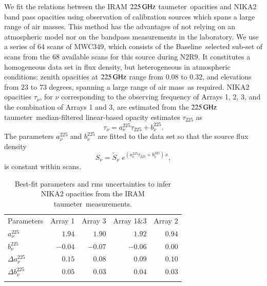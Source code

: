 \documentclass[traditionalabstract]{aa}
\newcommand{\baseline}{Baseline}%
\newcommand{\taunu}{\tau_{\nu}}
\newcommand{\taumeter}{taumeter}
\newcommand{\airmass}{air mass}
\newcommand{\lp}[1]{#1}
\begin{document}
{We fit the relations between the IRAM
$225\,\rm{GHz}$ \taumeter\ opacities and NIKA2 band pass opacities using
observation of calibration sources which spans a large range of air
masses. This method has the advantages of not relying on an atmospheric
model nor on the bandpass measurements in the laboratory.
We use a series of 64 scans of MWC349, which consists of the
\baseline\ selected sub-set of scans from the 68 available scans for
this source during N2R9.
It constitutes a homogeneous data set in flux density, but
heterogeneous in atmospheric conditions: zenith opacities at
$225\,\rm{GHz}$ range from 0.08 to 0.32, and elevations from $23$ to $73$
degrees, spanning a large range of \airmass\ as required.
NIKA2 opacities $\taunu$, for $\nu$ corresponding to the observing
frequency of Arrays 1, 2, 3, and the combination of Arrays 1 and 3, are estimated
from the $225\,\rm{GHz}$ \taumeter\ median-filtered linear-based opacity
estimates $\tau_{225}$ as
\begin{equation}  
  \tau_\nu =  a_\nu^{225}\tau_{225} + b_\nu^{225}.
  \label{eq:taumeter_model}
\end{equation}
The parameters $a_\nu^{225}$ and $b_\nu^{225}$ are fitted
to the data set so that the source flux density 
\begin{equation}  
  S_\nu = \tilde{S}_\nu\,\, e^{(a_\nu^{225}\tau_{225} + b_\nu^{225}) \, x}, 
  \label{eq:opacorr_taumeter}
\end{equation}
is constant within scans.

\begin{table}[!htbp]
  \begin{center}
    \caption[IRAM \taumeter\ to NIKA2 opacity model]{{\lp Best-fit
    parameters and rms uncertainties to infer NIKA2 opacities from the IRAM \taumeter\ measurements.}}
    \label{tab:tau225-to-taunika}  
    \begin{tabular}{lrrrr}
      \hline
      \hline
      \noalign{\smallskip}
      Parameters & Array 1 & Array 3  & Array 1$\&$3 & Array 2  \\
      \noalign{\smallskip}
      \hline
      \noalign{\smallskip}
      $a_\nu^{225}$         & $1.94$   &  $1.90$ &  $1.92$ & $0.94$ \\
      $b_\nu^{225}$         & $-0.04$  & $-0.07$ & $-0.06$ & $0.00$ \\
      $\Delta a_\nu^{225}$  & $0.15$  & $0.08$  &  $0.09$ & $0.10$ \\
      $\Delta b_\nu^{225}$  & $0.05$  & $0.03$  & $0.04$ & $0.03$ \\
      \noalign{\smallskip}
      \hline
    \end{tabular}
  \end{center}    
\end{table}

}
\end{document}
